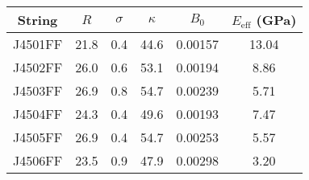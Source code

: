 \begin{tabular}{cccccc}
\toprule
String & $R$ & $\sigma$ & $\kappa$ & $B_0$ & $E_\mathrm{eff}$ (GPa) \\
\midrule
J4501FF & 21.8 & 0.4 & 44.6 & 0.00157 & 13.04 \\
J4502FF & 26.0 & 0.6 & 53.1 & 0.00194 & 8.86 \\
J4503FF & 26.9 & 0.8 & 54.7 & 0.00239 & 5.71 \\
J4504FF & 24.3 & 0.4 & 49.6 & 0.00193 & 7.47 \\
J4505FF & 26.9 & 0.4 & 54.7 & 0.00253 & 5.57 \\
J4506FF & 23.5 & 0.9 & 47.9 & 0.00298 & 3.20 \\
\bottomrule
\end{tabular}

